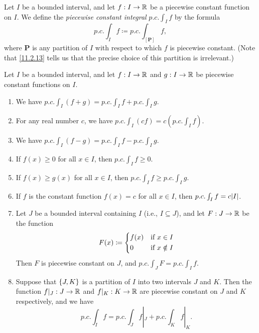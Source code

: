 \begin{defn}\label{11.2.14}
  Let \(I\) be a bounded interval, and let \(f : I \to \mathbb{R}\) be a piecewise constant function on \(I\).
  We define the \emph{piecewise constant integral} \(p.c. \int_I f\) by the formula
  \[
    p.c. \int_I f \coloneqq p.c. \int_{[\mathbf{P}]} f,
  \]
  where \(\mathbf{P}\) is any partition of \(I\) with respect to which \(f\) is piecewise constant.
  (Note that \cref{11.2.13} tells us that the precise choice of this partition is irrelevant.)
\end{defn}

\setcounter{thm}{15}
\begin{thm}\label{11.2.16}
  Let \(I\) be a bounded interval, and let \(f : I \to \mathbb{R}\) and \(g : I \to \mathbb{R}\) be piecewise constant functions on \(I\).
  \begin{enumerate}
    \item We have \(p.c. \int_I (f + g) = p.c. \int_I f + p.c. \int_I g\).
    \item For any real number \(c\), we have \(p.c. \int_I (cf) = c (p.c. \int_I f)\).
    \item We have \(p.c. \int_I (f - g) = p.c. \int_I f - p.c. \int_I g\).
    \item If \(f(x) \geq 0\) for all \(x \in I\), then \(p.c. \int_I f \geq 0\).
    \item If \(f(x) \geq g(x)\) for all \(x \in I\), then \(p.c. \int_I f \geq p.c. \int_I g\).
    \item If \(f\) is the constant function \(f(x) = c\) for all \(x \in I\), then \(p.c. \int_I f = c \abs{I}\).
    \item Let \(J\) be a bounded interval containing \(I\) (i.e., \(I \subseteq J\)), and let \(F : J \to \mathbb{R}\) be the function
          \[
            F(x) \coloneqq \begin{dcases}
              f(x) & \text{if } x \in I    \\
              0    & \text{if } x \notin I
            \end{dcases}
          \]
          Then \(F\) is piecewise constant on \(J\), and \(p.c. \int_J F = p.c. \int_I f\).
    \item Suppose that \(\left\lbrace J, K\right\rbrace\) is a partition of \(I\) into two intervals \(J\) and \(K\).
          Then the function \(f|_J : J \to \mathbb{R}\) and \(f|_K : K \to \mathbb{R}\) are piecewise constant on \(J\) and \(K\) respectively, and we have
          \[
            p.c. \int_I f = p.c. \int_J f|_J + p.c. \int_K f|_K.
          \]
  \end{enumerate}
\end{thm}

